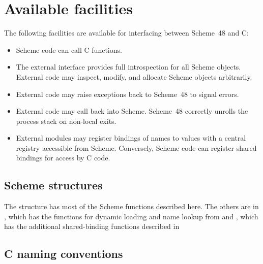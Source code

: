 
\section{Available facilities}
\label{sec:facilities}

The following facilities are available for interfacing between
 Scheme~48 and C:
%
\begin{itemize}
\item Scheme code can call C functions.
\item The external interface provides full introspection for all
  Scheme objects.  External code may inspect, modify, and allocate
  Scheme objects arbitrarily.
\item External code may raise exceptions back to Scheme~48 to
  signal errors.
\item External code may call back into Scheme.  Scheme~48
  correctly unrolls the process stack on non-local exits.
\item External modules may register bindings of names to values with a 
  central registry accessible from
  Scheme.  Conversely, Scheme code can register shared
  bindings for access by C code.
\end{itemize}
%

\subsection{Scheme structures}

The structure  has 
 most of the Scheme functions described here.
The others are in 
 , which has the functions for dynamic loading and
 name lookup from
 and , which has the additional shared-binding functions
 described in

\subsection{C naming conventions}

